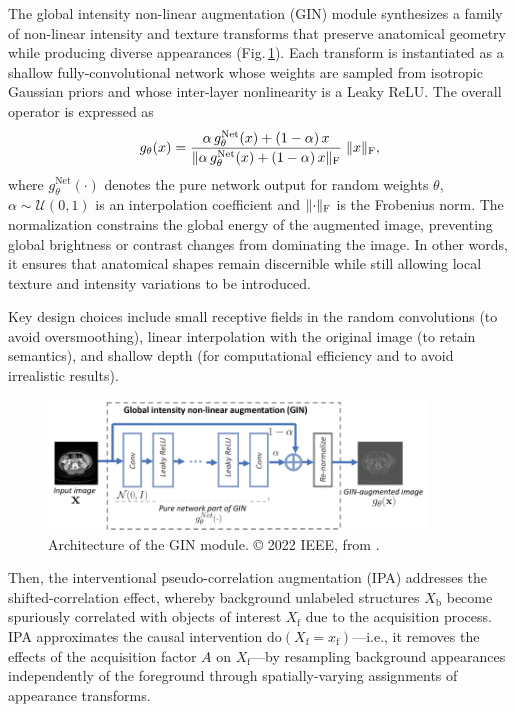 The global intensity non-linear augmentation (GIN) module synthesizes a family of non-linear intensity and texture transforms that preserve anatomical geometry while producing diverse appearances (Fig.\,\ref{fig:gin_schema}). Each transform is instantiated as a shallow fully-convolutional network whose weights are sampled from isotropic Gaussian priors and whose inter-layer nonlinearity is a Leaky ReLU. The overall operator is expressed as
\begin{equation}\label{eq:gin}
    g_{\theta}(x) = \frac{\alpha\,g^{\mathrm{Net}}_{\theta}(x) + (1-\alpha)\,x}{\lVert\alpha\,g^{\mathrm{Net}}_{\theta}(x) + (1-\alpha)\,x\rVert_\mathrm{F}}\;\lVert x\rVert_\mathrm{F},
\end{equation}
where $g^{\mathrm{Net}}_{\theta}(\cdot)$ denotes the pure network output for random weights $\theta$, $\alpha\sim\mathcal{U}(0,1)$ is an interpolation coefficient and $\lVert\cdot\rVert_\mathrm{F}$ is the Frobenius norm. The normalization constrains the global energy of the augmented image, preventing global brightness or contrast changes from dominating the image. In other words, it ensures that anatomical shapes remain discernible while still allowing local texture and intensity variations to be introduced.

Key design choices include small receptive fields in the random convolutions (to avoid oversmoothing), linear interpolation with the original image (to retain semantics), and shallow depth (for computational efficiency and to avoid irrealistic results).

\begin{figure}[htbp]
    \centering
    \includegraphics[width=0.9\textwidth]{figures/gin_schema.png}
    \caption{Architecture of the GIN module. © 2022 IEEE, from \cite{Ouyang2023}.}
    \label{fig:gin_schema}
\end{figure}

Then, the interventional pseudo-correlation augmentation (IPA) addresses the shifted-correlation effect, whereby background unlabeled structures $X_\mathrm{b}$ become spuriously correlated with objects of interest $X_\mathrm{f}$ due to the acquisition process. IPA approximates the causal intervention $\mathrm{do}(X_\mathrm{f}=x_\mathrm{f})$---i.e., it removes the effects of the acquisition factor $A$ on $X_\mathrm{f}$---by resampling background appearances independently of the foreground through spatially-varying assignments of appearance transforms.

